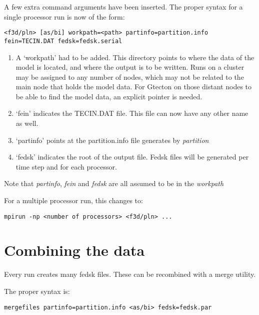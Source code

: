 \documentclass{article}
\begin{document}
A few extra command arguments have been inserted. The proper syntax for a single processor run is now of the form:

\begin{verbatim}
<f3d/pln> [as/bi] workpath=<path> partinfo=partition.info fein=TECIN.DAT fedsk=fedsk.serial
\end{verbatim}

\begin{enumerate}
\item A `workpath' had to be added. This directory points to where the data of the model is located, and where the output is to be written.
Runs on a cluster may be assigned to any number of nodes, which may not be related to the main node that holds the model data.
For Gtecton on those distant nodes to be able to find the model data, an explicit pointer is needed.

\item `fein' indicates the TECIN.DAT file. This file can now have any other name as well. 

\item `partinfo' points at the partition.info file generates by \textit{partition}

\item `fedsk' indicates the root of the output file. Fedsk files will be generated per time step and for each processor.
\end{enumerate}

Note that \textit{partinfo}, \textit{fein} and \textit{fedsk} are all assumed to be in the \textit{workpath}


For a multiple processor run, this changes to:

\begin{verbatim}
mpirun -np <number of processors> <f3d/pln> ... 
\end{verbatim}




\section{Combining the data}

Every run creates many fedsk files. These can be recombined with a merge utility.

The proper syntax is:

\begin{verbatim}
mergefiles partinfo=partition.info <as/bi> fedsk=fedsk.par
\end{verbatim}
\end{document}
